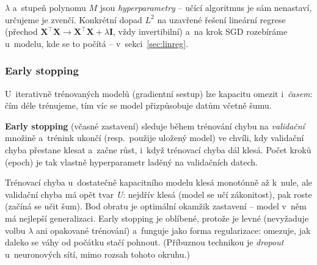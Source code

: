 \begin{poznamka}
$\lambda$ a~stupeň polynomu $M$ jsou \emph{hyperparametry} -- učící algoritmus je sám nenastaví, určujeme je zvenčí. Konkrétní dopad $L^2$ na uzavřené řešení lineární regrese (přechod $\mathbf{X}^{\!\top}\mathbf{X}\to\mathbf{X}^{\!\top}\mathbf{X}+\lambda\mathbf{I}$, vždy invertibilní) a~na krok SGD rozebíráme u~modelu, kde se to počítá -- v~sekci~\ref{sec:linreg}.
\end{poznamka}

\subsubsection*{Early stopping}

U~iterativně trénovaných modelů (gradientní sestup) lze kapacitu omezit i~\emph{časem}: čím déle trénujeme, tím víc se model přizpůsobuje datům včetně šumu.

\begin{definice}
\textbf{Early stopping} (včasné zastavení) sleduje během trénování chybu na \emph{validační} množině a~trénink ukončí (resp.\ použije uložený model) ve chvíli, kdy validační chyba přestane klesat a~začne růst, i~když trénovací chyba dál klesá. Počet kroků (epoch) je tak vlastně hyperparametr laděný na validačních datech.
\end{definice}

\begin{intuice}
Trénovací chyba u~dostatečně kapacitního modelu klesá monotónně až k~nule, ale validační chyba má opět tvar \emph{U}: nejdřív klesá (model se učí zákonitost), pak roste (začíná se učit šum). Bod obratu je optimální okamžik zastavení -- model v~něm má nejlepší generalizaci. Early stopping je oblíbené, protože je levné (nevyžaduje volbu $\lambda$ ani opakované trénování) a~funguje jako forma regularizace: omezuje, jak daleko se váhy od počátku stačí pohnout. (Příbuznou technikou je \emph{dropout} u~neuronových sítí, mimo rozsah tohoto okruhu.)
\end{intuice}

